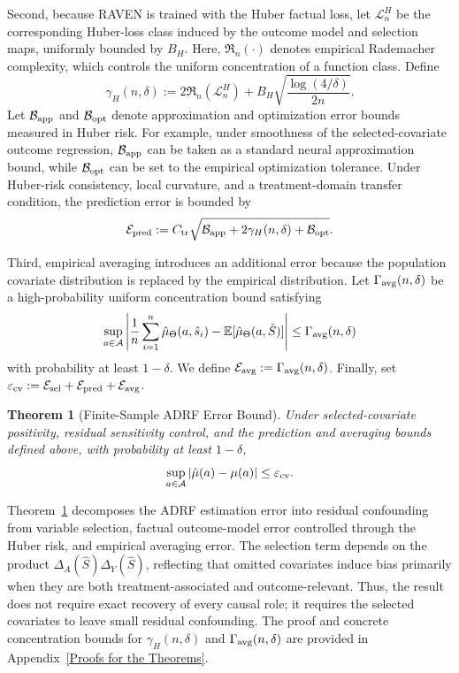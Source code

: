 \documentclass[twoside]{article}
\theoremstyle{plain}
\newtheorem{theorem}{Theorem}[section]
\theoremstyle{definition}
\theoremstyle{remark}
\newtheorem{proof sketch}[theorem]{Proof Sketch}
\begin{document}
Second, because RAVEN is trained with the Huber factual loss, let $\mathcal L_n^H$ be the corresponding Huber-loss class induced by the outcome model and selection maps, uniformly bounded by $B_H$. 
Here, $\mathfrak R_n(\cdot)$ denotes empirical Rademacher complexity, which controls the uniform concentration of a function class. 
Define
\[
    \gamma_H(n,\delta):=2\mathfrak R_n(\mathcal L_n^H)+B_H\sqrt{\frac{\log(4/\delta)}{2n}}.
\]
Let $\mathcal B_{\rm app}$ and $\mathcal B_{\rm opt}$ denote approximation and optimization error bounds measured in Huber risk.
For example, under smoothness of the selected-covariate outcome regression, $\mathcal B_{\rm app}$ can be taken as a standard neural approximation bound, while $\mathcal B_{\rm opt}$ can be set to the empirical optimization tolerance.
Under Huber-risk consistency, local curvature, and a treatment-domain transfer condition, the prediction error is bounded by
\[
    \mathcal E_{\rm pred}:=C_{\rm tr}\sqrt{\mathcal B_{\rm app}+2\gamma_H(n,\delta)+\mathcal B_{\rm opt}}.
\]

Third, empirical averaging introduces an additional error because the population covariate distribution is replaced by the empirical distribution. 
Let $\Gamma_{\rm avg}(n,\delta)$ be a high-probability uniform concentration bound satisfying
\[
    \sup_{a\in\mathcal A}\left|\frac{1}{n}\sum_{i=1}^{n}\hat\mu_\Theta(a,\hat s_i)-\mathbb{E}[\hat\mu_\Theta(a,\hat S)]\right|\leq\Gamma_{\rm avg}(n,\delta)
\]
with probability at least $1-\delta$. 
We define $\mathcal E_{\rm avg}:=\Gamma_{\rm avg}(n,\delta)$.
Finally, set $\varepsilon_{\rm cv} := \mathcal E_{\rm sel} + \mathcal E_{\rm pred} + \mathcal E_{\rm avg}$.

\begin{theorem}[Finite-Sample ADRF Error Bound]
\label{thm:finite_adrf_bound} 
Under selected-covariate positivity, residual sensitivity control, and the prediction and averaging bounds defined above, with probability at least $1-\delta$,
\[    
    \sup_{a\in\mathcal A} \left| \hat{\mu}(a)-\mu(a) \right| \leq \varepsilon_{\rm cv}. 
\] 
\end{theorem} 
Theorem~\ref{thm:finite_adrf_bound} decomposes the ADRF estimation error into residual confounding from variable selection, factual outcome-model error controlled through the Huber risk, and empirical averaging error.
The selection term depends on the product $\Delta_A(\hat S)\Delta_Y(\hat S)$, reflecting that omitted covariates induce bias primarily when they are both treatment-associated and outcome-relevant.
Thus, the result does not require exact recovery of every causal role; it requires the selected covariates to leave small residual confounding.
The proof and concrete concentration bounds for $\gamma_H(n,\delta)$ and $\Gamma_{\rm avg}(n,\delta)$ are provided in Appendix~\ref{Proofs for the Theorems}.
\end{document}
